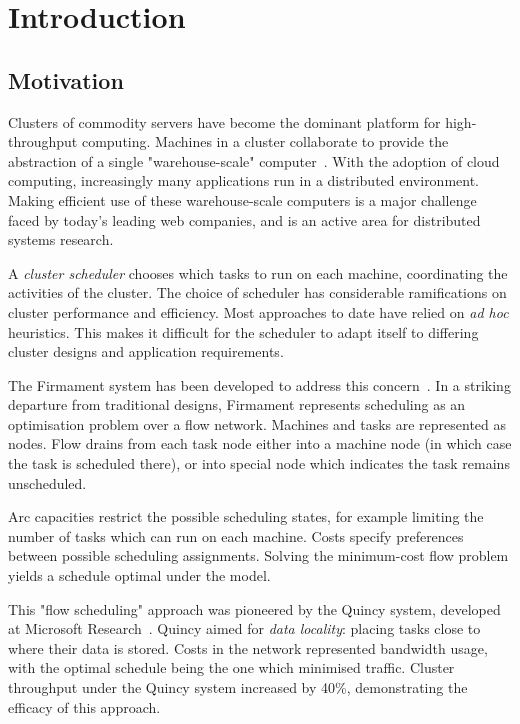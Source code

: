 \chapter{Introduction} \label{chap:intro}



\section{Motivation} \label{sec:intro-motivation}
Clusters of commodity servers have become the dominant platform for high-throughput computing. Machines in a cluster collaborate to provide the abstraction of a single "warehouse-scale" computer~\cite{WarehouseScale:2009}. With the adoption of cloud computing, increasingly many applications run in a distributed environment. Making efficient use of these warehouse-scale computers is a major challenge faced by today's leading web companies, and is an active area for distributed systems research.

A \emph{cluster scheduler} chooses which tasks to run on each machine, coordinating the activities of the cluster. The choice of scheduler has considerable ramifications on cluster performance and efficiency. Most approaches to date have relied on \emph{ad hoc} heuristics. This makes it difficult for the scheduler to adapt itself to differing cluster designs and application requirements.

The Firmament system has been developed to address this concern\footnotemark~\cite{Schwarzkopf:2015}. In a striking departure from traditional designs, Firmament represents scheduling as an optimisation problem over a flow network. Machines and tasks are represented as nodes. Flow drains from each task node either into a machine node (in which case the task is scheduled there), or into special node which indicates the task remains unscheduled.

Arc capacities restrict the possible scheduling states, for example limiting the number of tasks which can run on each machine. Costs specify preferences between possible scheduling assignments. Solving the minimum-cost flow problem yields a schedule optimal under the model.

This "flow scheduling" approach was pioneered by the Quincy system, developed at Microsoft Research~\cite{Isard:2009}. Quincy aimed for \emph{data locality}: placing tasks close to where their data is stored. Costs in the network represented bandwidth usage, with the optimal schedule being the one which minimised traffic. Cluster throughput under the Quincy system increased by 40\%, demonstrating the efficacy of this approach.


